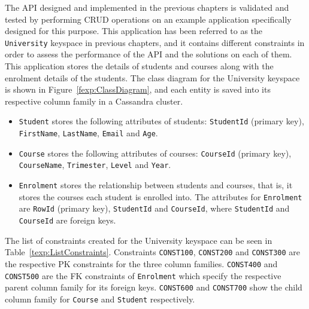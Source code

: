 The  \ac{API} designed and implemented in the previous chapters is validated and
tested by performing \ac{CRUD} operations on an example application
specifically designed for this purpose.  This application has been referred to
as the \texttt{University} keyspace in previous chapters,  and it contains
different constraints in order to  assess the performance of the \ac{API} and
the solutions on each of them.  This application stores the details of students and
 courses along with the enrolment details of the students.  The class diagram for
 the University keyspace is shown in Figure~\ref{fexp:ClassDiagram},  and each
 entity is saved into its respective column family in a Cassandra cluster. 

	\begin{itemize}
	  \item \texttt{Student} stores the  following attributes of students:
	   \texttt{StudentId} (primary key),  \texttt{FirstName},  \texttt{LastName}, 
	  \texttt{Email} and \texttt{Age}. 
	  \item \texttt{Course} stores  the following  attributes of courses:
	  \texttt{CourseId} (primary key),  \texttt{CourseName},  \texttt{Trimester}, 
	  \texttt{Level} and \texttt{Year}. 
	  \item \texttt{Enrolment} stores the  relationship between
	  students and courses,  that is,  it stores the courses each student is enrolled
	  into.   The attributes for \texttt{Enrolment} are \texttt{RowId} (primary
	  key),  \texttt{StudentId} and \texttt{CourseId},  where \texttt{StudentId}
	  and \texttt{CourseId} are foreign keys. 
	\end{itemize}
	
	


The list of constraints created for the University keyspace can be seen in
Table~\ref{texp:ListConstraints}.  Constraints \texttt{CONST100}, 
\texttt{CONST200} and \texttt{CONST300} are the respective \ac{PK} constraints
for the three column families.  \texttt{CONST400} and \texttt{CONST500} are the
\ac{FK} constraints of \texttt{Enrolment} which specify the respective parent
column family for its foreign keys.  \texttt{CONST600} and \texttt{CONST700} show
the child column family for \texttt{Course} and \texttt{Student} respectively. 


